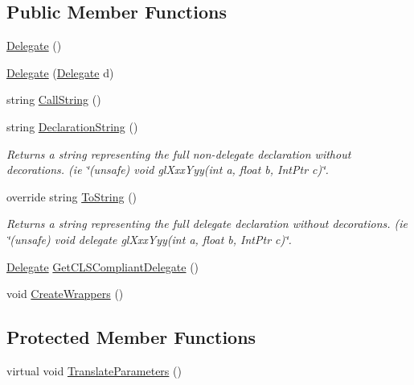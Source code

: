 \subsection*{Public Member Functions}
\begin{DoxyCompactItemize}
\item 
\hyperlink{class_bind_1_1_structures_1_1_delegate_ad175f5483f0fd7ccd20934fe62834041}{Delegate} ()
\item 
\hyperlink{class_bind_1_1_structures_1_1_delegate_a9c17c8d4063a542e1d8a8000749e6afb}{Delegate} (\hyperlink{class_bind_1_1_structures_1_1_delegate}{Delegate} d)
\item 
string \hyperlink{class_bind_1_1_structures_1_1_delegate_a331c7c1297a4eeba4625166706780e2d}{CallString} ()
\item 
string \hyperlink{class_bind_1_1_structures_1_1_delegate_a48c9613897a513421cd6b7107111edca}{DeclarationString} ()
\begin{DoxyCompactList}\small\item\em Returns a string representing the full non-\/delegate declaration without decorations. (ie \char`\"{}(unsafe) void glXxxYyy(int a, float b, IntPtr c)\char`\"{}. \item\end{DoxyCompactList}\item 
override string \hyperlink{class_bind_1_1_structures_1_1_delegate_a4879df67a87d0a937de8f4f6ccf787f9}{ToString} ()
\begin{DoxyCompactList}\small\item\em Returns a string representing the full delegate declaration without decorations. (ie \char`\"{}(unsafe) void delegate glXxxYyy(int a, float b, IntPtr c)\char`\"{}. \item\end{DoxyCompactList}\item 
\hyperlink{class_bind_1_1_structures_1_1_delegate}{Delegate} \hyperlink{class_bind_1_1_structures_1_1_delegate_ab831cff738ac1398ee2e9b9d20e23a1d}{GetCLSCompliantDelegate} ()
\item 
void \hyperlink{class_bind_1_1_structures_1_1_delegate_af5f81f0684d6d78596594af216e91d2e}{CreateWrappers} ()
\end{DoxyCompactItemize}
\subsection*{Protected Member Functions}
\begin{DoxyCompactItemize}
\item 
virtual void \hyperlink{class_bind_1_1_structures_1_1_delegate_a7f7f8ee6f37bafcbb6d2d15c08ae1a25}{TranslateParameters} ()
\end{DoxyCompactItemize}
